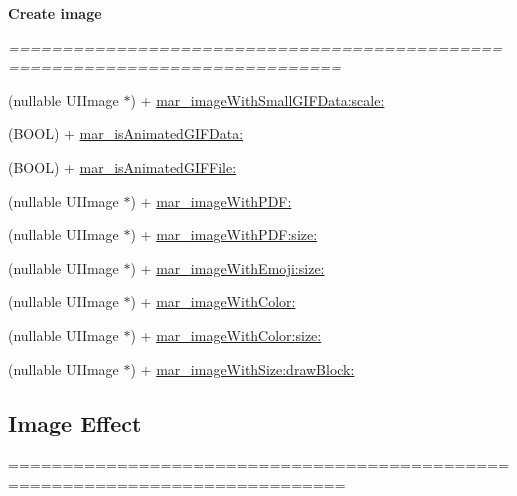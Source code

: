 \begin{Indent}\textbf{ Create image}\par
{\em ============================================================================= 

 }\begin{DoxyCompactItemize}
\item 
(nullable U\+I\+Image $\ast$) + \hyperlink{category_u_i_image_07_m_a_r_e_x_08_a158c590ad06766cae9e9b9309ce9bdde}{mar\+\_\+image\+With\+Small\+G\+I\+F\+Data\+:scale\+:}
\item 
(B\+O\+OL) + \hyperlink{category_u_i_image_07_m_a_r_e_x_08_ac34aa1dec41b75dfa98c1392ecef1d66}{mar\+\_\+is\+Animated\+G\+I\+F\+Data\+:}
\item 
(B\+O\+OL) + \hyperlink{category_u_i_image_07_m_a_r_e_x_08_a7f5d4aec9d1a0e7efc85daf3e7f8c9a0}{mar\+\_\+is\+Animated\+G\+I\+F\+File\+:}
\item 
(nullable U\+I\+Image $\ast$) + \hyperlink{category_u_i_image_07_m_a_r_e_x_08_a34a99e3b432978039bfcfdb05a34cfef}{mar\+\_\+image\+With\+P\+D\+F\+:}
\item 
(nullable U\+I\+Image $\ast$) + \hyperlink{category_u_i_image_07_m_a_r_e_x_08_a53a3e8db1581454b9ff3e356a9730722}{mar\+\_\+image\+With\+P\+D\+F\+:size\+:}
\item 
(nullable U\+I\+Image $\ast$) + \hyperlink{category_u_i_image_07_m_a_r_e_x_08_a36768c8ad1f1c2990bbb0414cf407f76}{mar\+\_\+image\+With\+Emoji\+:size\+:}
\item 
(nullable U\+I\+Image $\ast$) + \hyperlink{category_u_i_image_07_m_a_r_e_x_08_ae3ea71eb9e643ce325e1ff668caee094}{mar\+\_\+image\+With\+Color\+:}
\item 
(nullable U\+I\+Image $\ast$) + \hyperlink{category_u_i_image_07_m_a_r_e_x_08_a3339593136e1bac6fc9159410ff4ae1d}{mar\+\_\+image\+With\+Color\+:size\+:}
\item 
(nullable U\+I\+Image $\ast$) + \hyperlink{category_u_i_image_07_m_a_r_e_x_08_a0e513610a16e5006223674bcf2f3824c}{mar\+\_\+image\+With\+Size\+:draw\+Block\+:}
\end{DoxyCompactItemize}
\end{Indent}
\subsection*{Image Effect}
\label{_amgrpae7a6b13e5f20da483e9cf0abed5e233}%
============================================================================= 

